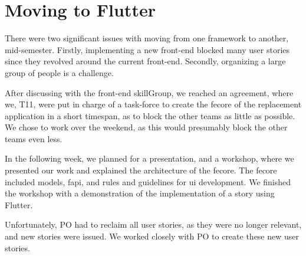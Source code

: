 \section{Moving to Flutter} \label{sec:moving-to-flutter}

There were two significant issues with moving from one framework to another, mid-semester. Firstly, implementing a new front-end blocked many user stories since they revolved around the current front-end. Secondly, organizing a large group of people is a challenge.

After discussing with the front-end \gls{skillGroup}, we reached an agreement, where we, \gls{T11}, were put in charge of a task-force to create the \gls{fecore} of the replacement application in a short timespan, as to block the other teams as little as possible. We chose to work over the weekend, as this would presumably block the other teams even less.

In the following week, we planned for a presentation, and a workshop, where we presented our work and explained the architecture of the \gls{fecore}. The \gls{fecore} included models, \gls{fapi}, and rules and guidelines for \gls{ui} development. We finished the workshop with a demonstration of the implementation of a story using Flutter.

Unfortunately, \gls{PO} had to reclaim all user stories, as they were no longer relevant, and new stories were issued. We worked closely with \gls{PO} to create these new user stories.
